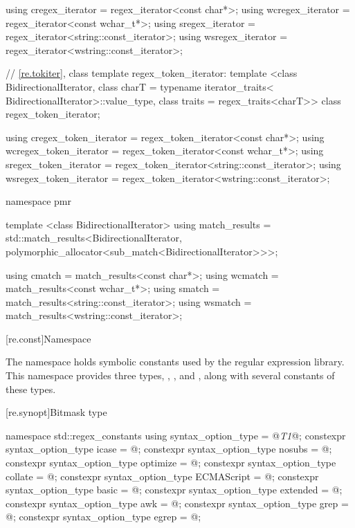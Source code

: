 \begin{codeblock}
{  using cregex_iterator  = regex_iterator<const char*>;
  using wcregex_iterator = regex_iterator<const wchar_t*>;
  using sregex_iterator  = regex_iterator<string::const_iterator>;
  using wsregex_iterator = regex_iterator<wstring::const_iterator>;

  // \ref{re.tokiter}, class template regex_token_iterator:
  template <class BidirectionalIterator, 
            class charT = typename iterator_traits<
              BidirectionalIterator>::value_type,
            class traits = regex_traits<charT>>
    class regex_token_iterator;

  using cregex_token_iterator  = regex_token_iterator<const char*>;
  using wcregex_token_iterator = regex_token_iterator<const wchar_t*>;
  using sregex_token_iterator  = regex_token_iterator<string::const_iterator>;
  using wsregex_token_iterator = regex_token_iterator<wstring::const_iterator>;

  namespace pmr {
    template <class BidirectionalIterator>
      using match_results =
        std::match_results<BidirectionalIterator,
                           polymorphic_allocator<sub_match<BidirectionalIterator>>>;

    using cmatch  = match_results<const char*>;
    using wcmatch = match_results<const wchar_t*>;
    using smatch  = match_results<string::const_iterator>;
    using wsmatch = match_results<wstring::const_iterator>;
  }
}
\end{codeblock}

[re.const]{Namespace }

\pnum
{}%
The namespace  holds
symbolic constants used by the regular expression library.  This
namespace provides three types, , 
, and , along with several
constants of these types.

[re.synopt]{Bitmask type }
%
%
\begin{codeblock}
namespace std::regex_constants {
  using syntax_option_type = @\textit{T1}@;
  constexpr syntax_option_type icase = @\unspec@;
  constexpr syntax_option_type nosubs = @\unspec@;
  constexpr syntax_option_type optimize = @\unspec@;
  constexpr syntax_option_type collate = @\unspec@;
  constexpr syntax_option_type ECMAScript = @\unspec@;
  constexpr syntax_option_type basic = @\unspec@;
  constexpr syntax_option_type extended = @\unspec@;
  constexpr syntax_option_type awk = @\unspec@;
  constexpr syntax_option_type grep = @\unspec@;
  constexpr syntax_option_type egrep = @\unspec@;
}
\end{codeblock}


